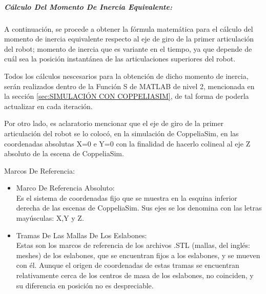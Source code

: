\documentclass{article}
\begin{document}
\begin{sloppypar}
\hfill

\subparagraph{Cálculo Del Momento De Inercia Equivalente:}
\label{sec:Cálculo Del Momento De Inercia Equivalente:}

\hfill

\hfill

A continuación, se procede a obtener la fórmula matemática para el cálculo del momento de inercia equivalente respecto al eje de giro de la primer articulación del robot; momento de inercia que es variante en el tiempo, ya que depende de cuál sea la posición instantánea de las articulaciones superiores del robot.

Todos los cálculos nescesarios para la obtención de dicho momento de inercia, serán realizados dentro de la Función S de MATLAB de nivel 2, mencionada en la sección \ref{sec:SIMULACIÓN CON COPPELIASIM}, de tal forma de poderla actualizar en cada iteración.

Por otro lado, es aclaratorio mencionar que el eje de giro de la primer articulación del robot se lo colocó, en la simulación de CoppeliaSim, en las coordenadas absolutas X=0 e Y=0 con la finalidad de hacerlo colineal al eje Z absoluto de la escena de CoppeliaSim.

\hfill \break
Marcos De Referencia:
\begin{itemize}
    \item Marco De Referencia Absoluto:
        \\ Es el sistema de coordenadas fijo que se muestra en la esquina inferior derecha de las escenas de CoppeliaSim. Sus ejes se los denomina con las letras mayúsculas: X,Y y Z.
    \item Tramas De Las Mallas De Los Eslabones:
        \\ Estas son los marcos de referencia de los archivos .STL (mallas, del inglés: meshes) de los eslabones, que se encuentran fijos a los eslabones, y se mueven con él. Aunque el origen de coordenadas de estas tramas se encuentran relativamente cerca de los centros de masa de los eslabones, no coinciden, y su diferencia en posición no es despreciable.
\end{itemize}


\end{sloppypar}
\end{document}
